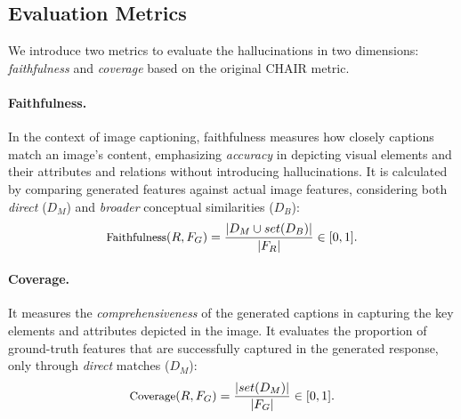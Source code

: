 \subsection{Evaluation Metrics}
\label{sec:evaluation_metrics}

We introduce two metrics to evaluate the hallucinations in two dimensions: \textit{faithfulness} and \textit{coverage} based on the original CHAIR metric. 

\paragraph{Faithfulness.} In the context of image captioning, faithfulness measures how closely captions match an image's content, emphasizing \textit{accuracy} in depicting visual elements and their attributes and relations without introducing hallucinations. It is calculated by comparing generated features against actual image features, considering both \textit{direct} ($D_{M}$) and \textit{broader} conceptual similarities ($D_{B}$):
\begin{equation}
    \small
    \text{Faithfulness}(R, F_G) = \frac{|D_{M} \cup set(D_{B})|}{|F_R|} \in [0,1].
\end{equation}

\paragraph{Coverage.} It measures the \textit{comprehensiveness} of the generated captions in capturing the key elements and attributes depicted in the image. It evaluates the proportion of ground-truth features that are successfully captured in the generated response, only through \textit{direct} matches ($D_{M}$):
\begin{equation}
    \small
    \text{Coverage}(R, F_G) = \frac{|set(D_{M})|}{|F_G|} \in [0,1].
\end{equation}